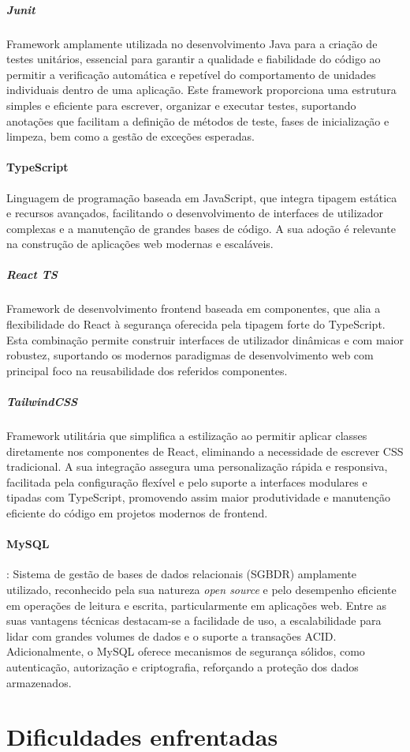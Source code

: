 \subparagraph{Junit} Framework amplamente utilizada no desenvolvimento Java para a criação de testes unitários, essencial para garantir a qualidade e fiabilidade do código ao permitir a verificação automática e repetível do comportamento de unidades individuais dentro de uma aplicação. Este framework proporciona uma estrutura simples e eficiente para escrever, organizar e executar testes, suportando anotações que facilitam a definição de métodos de teste, fases de inicialização e limpeza, bem como a gestão de exceções esperadas.

\paragraph{TypeScript} Linguagem de programação baseada em JavaScript, que integra tipagem estática e recursos avançados, facilitando o desenvolvimento de interfaces de utilizador complexas e a manutenção de grandes bases de código. A sua adoção é relevante na construção de aplicações web modernas e escaláveis.

\subparagraph{React TS} Framework de desenvolvimento frontend baseada em componentes, que alia a flexibilidade do React à segurança oferecida pela tipagem forte do TypeScript. Esta combinação permite construir interfaces de utilizador dinâmicas e com maior robustez, suportando os modernos paradigmas de desenvolvimento web com principal foco na reusabilidade dos referidos componentes.

\subparagraph{TailwindCSS} Framework utilitária que simplifica a estilização ao permitir aplicar classes diretamente nos componentes de React, eliminando a necessidade de escrever CSS tradicional. A sua integração assegura uma personalização rápida e responsiva, facilitada pela configuração flexível e pelo suporte a interfaces modulares e tipadas com TypeScript, promovendo assim maior produtividade e manutenção eficiente do código em projetos modernos de frontend.

\paragraph{MySQL}: Sistema de gestão de bases de dados relacionais (SGBDR) amplamente utilizado, reconhecido pela sua natureza \textit{open source} e pelo desempenho eficiente em operações de leitura e escrita, particularmente em aplicações web. Entre as suas vantagens técnicas destacam-se a facilidade de uso, a escalabilidade para lidar com grandes volumes de dados e o suporte a transações ACID. Adicionalmente, o MySQL oferece mecanismos de segurança sólidos, como autenticação, autorização e criptografia, reforçando a proteção dos dados armazenados.




\section{Dificuldades enfrentadas}

\subsection{}